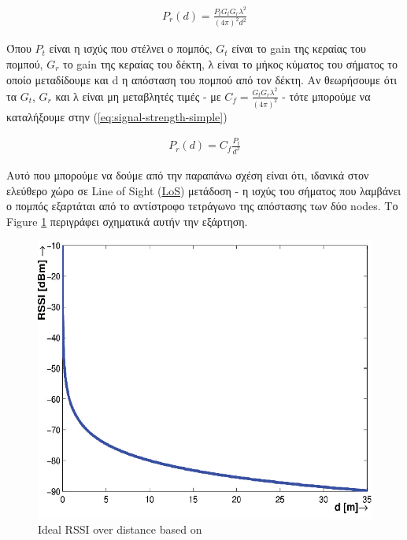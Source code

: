 \begin{align}
	P_r(d)=\frac{P_tG_tG_r\lambda^2}{(4\pi)^2d^2} \label{eq:signal-strength}
\end{align}

Όπου $P_t$ είναι η ισχύς που στέλνει ο πομπός, $G_t$ είναι το gain της κεραίας του
πομπού, $G_r$ το gain της κεραίας του δέκτη, λ είναι το μήκος κύματος του σήματος
το οποίο μεταδίδουμε και d η απόσταση του πομπού από τον δέκτη. Αν θεωρήσουμε ότι 
τα $G_t$, $G_r$ και λ είναι μη μεταβλητές τιμές - με $C_f = \frac{G_tG_r\lambda^2}{(4\pi)^2}$ - τότε μπορούμε να καταλήξουμε
στην (\ref{eq:signal-strength-simple}) \cite{rssi-simple-formula}

\begin{align}
	P_r(d)=C_f\frac{P_t}{d^2} \label{eq:signal-strength-simple}
\end{align}

Αυτό που μπορούμε να δούμε από την παραπάνω σχέση είναι ότι, ιδανικά στον ελεύθερο 
χώρο σε Line of Sight (\hyperref[abbr:LoS]{LoS}) μετάδοση -
η ισχύς του σήματος που λαμβάνει ο πομπός εξαρτάται από το αντίστροφο τετράγωνο της
απόστασης των δύο nodes. Το Figure \ref{fig:Ideal-RSSI-over-distance} περιγράφει 
σχηματικά αυτήν την εξάρτηση. 


\begin{figure} [H]
	\centering
	\includegraphics[scale=0.32]{Images/Theoretical-Background/Ideal-RSSI-over-distance.png}
	\decoRule
	\caption[Ideal RSSI over distance]{Ideal RSSI over distance based on \cite{ideal-rssi-model}}
	\label{fig:Ideal-RSSI-over-distance}
\end{figure}


